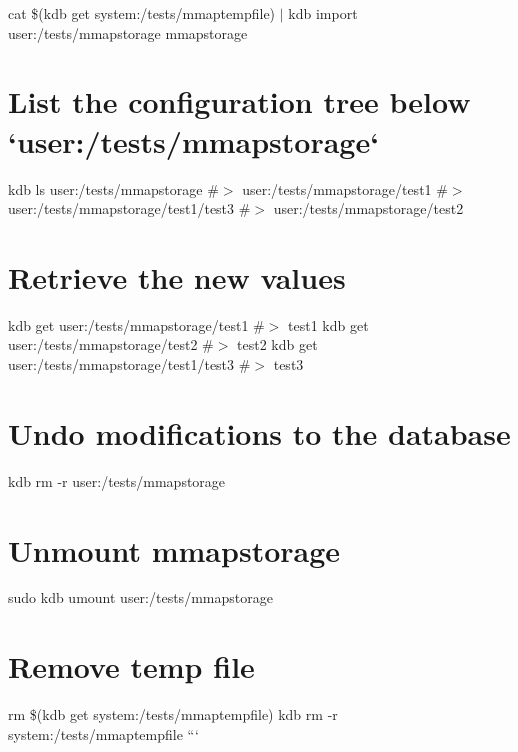 cat \$(kdb get system\+:/tests/mmaptempfile) $\vert$ kdb import user\+:/tests/mmapstorage mmapstorage\hypertarget{autotoc_md411_autotoc_md428}{}\section{List the configuration tree below `user\+:/tests/mmapstorage`}\label{autotoc_md411_autotoc_md428}
kdb ls user\+:/tests/mmapstorage \#$>$ user\+:/tests/mmapstorage/test1 \#$>$ user\+:/tests/mmapstorage/test1/test3 \#$>$ user\+:/tests/mmapstorage/test2\hypertarget{autotoc_md411_autotoc_md429}{}\section{Retrieve the new values}\label{autotoc_md411_autotoc_md429}
kdb get user\+:/tests/mmapstorage/test1 \#$>$ test1 kdb get user\+:/tests/mmapstorage/test2 \#$>$ test2 kdb get user\+:/tests/mmapstorage/test1/test3 \#$>$ test3\hypertarget{autotoc_md411_autotoc_md430}{}\section{Undo modifications to the database}\label{autotoc_md411_autotoc_md430}
kdb rm -\/r user\+:/tests/mmapstorage\hypertarget{autotoc_md411_autotoc_md431}{}\section{Unmount mmapstorage}\label{autotoc_md411_autotoc_md431}
sudo kdb umount user\+:/tests/mmapstorage\hypertarget{autotoc_md411_autotoc_md432}{}\section{Remove temp file}\label{autotoc_md411_autotoc_md432}
rm \$(kdb get system\+:/tests/mmaptempfile) kdb rm -\/r system\+:/tests/mmaptempfile ``` 